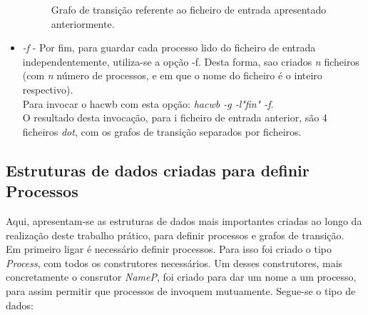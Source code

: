 \begin{itemize}
\begin{figure}[!htb]
\begin{center}
\label{fig:tg}
\caption{Grafo de transição referente ao ficheiro de entrada apresentado anteriormente.}
\end{center}
\end{figure}

\item \textit{-f} - Por fim, para guardar cada processo lido do ficheiro de entrada independentemente, utiliza-se 
a opção -f. Desta forma, sao criados \textit{n} ficheiros (com \textit{n} número de processos, e em que o nome 
do ficheiro é o inteiro respectivo).\\
Para invocar o hacwb com esta opção: \textit{hacwb -g -l"fin" -f}.\\
O resultado desta invocação, para i ficheiro de entrada anterior, são 4 ficheiros \textit{dot}, com os grafos de 
transição separados por ficheiros.
\end{itemize}

\subsection{Estruturas de dados criadas para definir Processos}

Aqui, apresentam-se as estruturas de dados mais importantes criadas ao longo da realização deste trabalho prático, 
para definir processos e grafos de transição.\\
Em primeiro ligar é necessário definir processos. Para isso foi criado o tipo \textit{Process}, com todos os construtores 
necessários. Um desses construtores, mais concretamente o consrutor \textit{NameP}, foi criado para dar um nome a um processo, 
para assim permitir que processos de invoquem mutuamente. Segue-se o tipo de dados:\\

